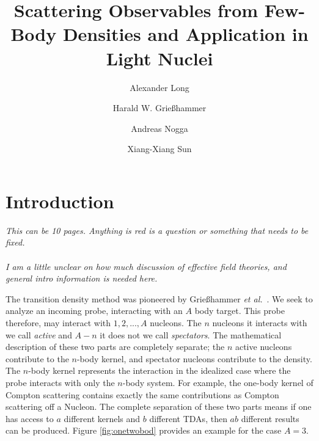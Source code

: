\documentclass[a4paper,11pt]{article}
\title{Scattering Observables from Few-Body Densities and Application
in Light Nuclei}
\author*[a]{Alexander Long}
\author[a]{Harald W. Grie{\ss}hammer}
\author[b]{Andreas Nogga}
\author[b]{Xiang-Xiang Sun}
\affiliation[a]{The George Washington University\\ Washington DC USA}
\affiliation[b]{Name of Andreas' institution here}
\newcommand{\etal}{\textit{et al.}}
\newcommand{\ques}[1]{\color{red}\textit{ #1 }\color{black}}
\begin{document}
\maketitle

\section{Introduction}
\ques{This can be 10 pages. Anything is red is a question or
  something that needs to be fixed.\\~\\ I am a little unclear on how
  much discussion of effective field theories, and general intro
  information is needed here.
}

The transition density method was pioneered by Grie{\ss}hammer \etal\,
\cite{hammer2020}.
We seek to analyze an incoming probe, interacting with an $A$ body target.
This probe therefore, may interact with
$1,2,...,A$ nucleons.
The $n$ nucleons it interacts with we call \textit{active} and $A-n$
it does not we call \textit{spectators}.
The mathematical description of these two parts are completely
separate; the $n$ active nucleons contribute to the $n$-body kernel, and spectator
nucleons contribute to the density.
The $n$-body kernel represents the interaction in the idealized case where the probe interacts
with only the $n$-body system. For example, the one-body kernel of Compton scattering contains exactly the 
same contributions as Compton scattering off a Nucleon.
The complete separation of these two parts means if one has access to
$a$ different kernels and $b$ different TDAs, then
$ab$ different results can be produced.
Figure \ref{fig:onetwobod} provides an example for the case $A=3$.
\end{document}
